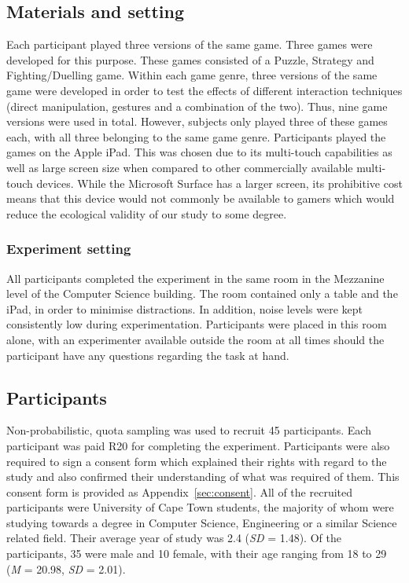 \subsection{Materials and setting}

Each participant played three versions of the same game. Three games were developed for this purpose. These games consisted of a Puzzle, Strategy and Fighting/Duelling game. Within each game genre, three versions of the same game were developed in order to test the effects of different interaction techniques (direct manipulation, gestures and a combination of the two). Thus, nine game versions were used in total. However, subjects only played three of these games each, with all three belonging to the same game genre. Participants played the games on the Apple iPad. This was chosen due to its multi-touch capabilities as well as large screen size when compared to other commercially available multi-touch devices. While the Microsoft Surface has a larger screen, its prohibitive cost means that this device would not commonly be available to gamers which would reduce the ecological validity of our study to some degree.

\subsubsection{Experiment setting}
All participants completed the experiment in the same room in the Mezzanine level of the Computer Science building. The room contained only a table and the iPad, in order to minimise distractions. In addition, noise levels were kept consistently low during experimentation. Participants were placed in this room alone, with an experimenter available outside the room at all times should the participant have any questions regarding the task at hand. 

\subsection{Participants}
Non-probabilistic, quota sampling was used to recruit 45 participants. Each participant was paid R20 for completing the experiment. Participants were also required to sign a consent form which explained their rights with regard to the study and also confirmed their understanding of what was required of them. This consent form is provided as Appendix~\ref{sec:consent}. All of the recruited participants were University of Cape Town students, the majority of whom were studying towards a degree in Computer Science, Engineering or a similar Science related field. Their average year of study was 2.4 (\emph{SD} = 1.48). Of the participants, 35 were male and 10 female, with their age ranging from 18 to 29 (\emph{M} = 20.98, \emph{SD} = 2.01).

